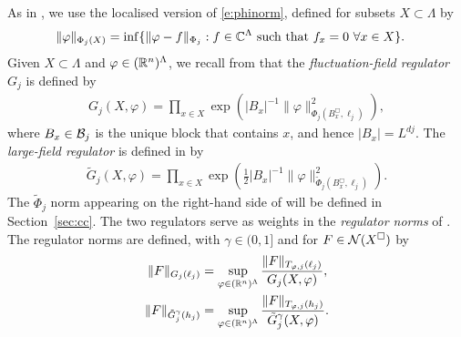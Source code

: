 As in \cite[(\ref{IE-e:PhiXdef})]{BS-rg-IE}, we use the localised version
of \eqref{e:phinorm}, defined for subsets $X \subset \Lambda$  by
\begin{align}
\label{e:PhiXdef}
    \|\varphi\|_{\Phi_j(X)}
    &=
    \inf \{ \|\varphi -f\|_{\Phi_j} :
    \text{$f \in \mathbb{C}^\Lambda$ such that $f_{x} = 0$
    $\forall x\in X$}\}.
\end{align}
Given $X \subset \Lambda$ and $\varphi \in ({\mathbb R}^n)^{\Lambda}$,
we recall from \cite[\eqref{IE-e:GPhidef}]{BS-rg-IE}
that the
\emph{fluctuation-field regulator} $G_j$
is defined by
\begin{align}
\label{e:GPhidef}
    G_j(X,\varphi)
    =
    \prod_{x \in X} \exp
    \left(|B_{x}|^{-1}\|\varphi\|_{\Phi_j (B_{x}^\Box,\ell_j )}^2 \right)
    ,
\end{align}
where $B_{x}\in \mathcal{B}_j$ is the unique block that contains $x$,
and hence $|B_x| = L^{dj}$.
The \emph{large-field regulator} is defined in \cite[\eqref{IE-e:9Gdef}]{BS-rg-IE} by
\begin{align}
\label{e:9Gdef}
    \tilde G_j  (X,\varphi)
    =
    \prod_{x \in X}
    \exp \left(
    \frac 12 |B_{x}|^{-1}\|\varphi\|_{\tilde\Phi_j (B_{x}^\Box,\ell_j)}^2
    \right)
    .
\end{align}
The $\tilde\Phi_j$ norm appearing on the right-hand side of  will be defined
in Section~\ref{sec:cc}.
The two regulators serve as weights in the \emph{regulator norms} of
\cite[Definition~\ref{IE-def:Gnorms}]{BS-rg-IE}.
The regulator norms are defined,  with $\gamma \in (0,1]$ and
for $F \in \mathcal{N}(X^\Box)$ by
\begin{align}
\label{e:Gnormdef1}
    \| F\|_{G_j(\ell_j)}
    &=
    \sup_{\varphi \in ({\mathbb R}^n)^\Lambda}
    \frac{\|F\|_{T_{\varphi,j}(\ell_j)}}{G_{j}(X,\varphi)}
    ,
\\
\label{e:Gnormdef2}
    \|F\|_{\tilde G_j^{\gamma}(h_j)}
    &=
    \sup_{\varphi \in ({\mathbb R}^n)^\Lambda}
    \frac{\|F \|_{T_{\varphi,j}(h_j)}}{\tilde{G}^{\gamma}_{j}(X,\varphi)}
    .
\end{align}
